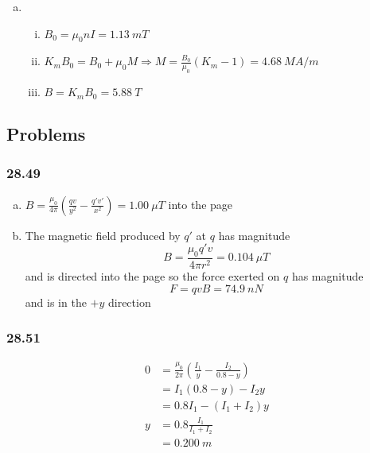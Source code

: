 \documentclass{article}
\begin{document}
\begin{enumerate}[(a)]
  \item

        \begin{enumerate}[(i)]
          \item $B_0 = \mu_0 n I = \qty{1.13}{mT}$

          \item $K_m B_0 = B_0 + \mu_0 M \Rightarrow M = \frac{B_0}{\mu_0} (K_m - 1) = \qty{4.68}{MA/m}$

          \item $B = K_m B_0 = \qty{5.88}{T}$
        \end{enumerate}
\end{enumerate}

\subsection{Problems}

\subsubsection{28.49}

\begin{enumerate}[(a)]
  \item $B = \frac{\mu_0}{4 \pi} \left( \frac{q v}{y^2} - \frac{q' v'}{x^2} \right) = \qty{1.00}{\mu T}$ into the page

  \item The magnetic field produced by $q'$ at $q$ has magnitude \[B = \frac{\mu_0 q' v}{4 \pi r^2} = \qty{0.104}{\mu T}\] and is directed into the page so the force exerted on $q$ has magnitude \[F = q v B = \qty{74.9}{nN}\] and is in the $+y$ direction
\end{enumerate}

\subsubsection{28.51}

\begin{align*}
  0 & = \frac{\mu_0}{2 \pi} \left( \frac{I_1}{y} - \frac{I_2}{0.8 - y} \right) \\
    & = I_1 (0.8 - y) - I_2 y                                                  \\
    & = 0.8 I_1 - (I_1 + I_2) y                                                \\
  y & = 0.8 \frac{I_1}{I_1 + I_2}                                              \\
    & = \qty{0.200}{m}
\end{align*}
\end{document}
